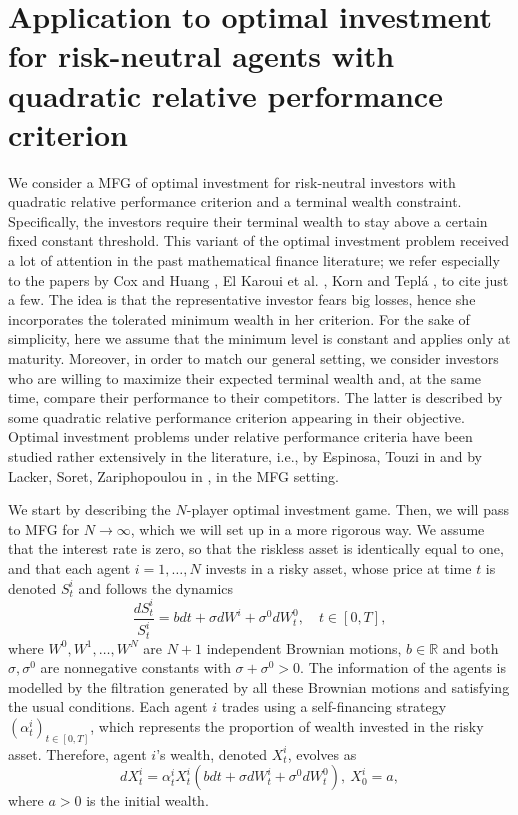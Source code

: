 \documentclass[11pt,a4paper]{article}
\begin{document}
\section{Application to optimal investment for risk-neutral agents with quadratic relative performance criterion}\label{sec:appl}


We consider a MFG of optimal investment for risk-neutral investors with quadratic relative performance criterion and a terminal wealth constraint. Specifically, the investors require their terminal wealth to stay above a certain fixed constant threshold. This variant of the optimal investment problem received a lot of attention in the past mathematical finance literature; we refer especially to the papers by Cox and Huang \cite{Cox Huang}, El Karoui et al. \cite{ElK-J-L}, Korn \cite{Korn} and Tepl\'a \cite{Tepla}, to cite just a few. The idea is that the representative investor fears big losses, hence she incorporates the tolerated minimum wealth in her criterion. For the sake of simplicity, here we assume that the minimum level is constant and applies only at maturity. Moreover, in order to match our general setting, we consider investors who are willing to maximize their expected terminal wealth and, at the same time, compare their performance to their competitors. The latter is described by some quadratic relative performance criterion appearing in their objective.  
 Optimal investment problems under relative performance criteria have been studied rather extensively in the literature, i.e., by Espinosa, Touzi in \cite{Espinosa Touzi} and by Lacker, Soret, Zariphopoulou in  \cite{Lacker S}, \cite{Lacker Z} in the MFG setting.\medskip
 
We start by describing the $N$-player optimal investment game. Then, we will pass to MFG for $N \to \infty$, which we will set up in a more rigorous way. We assume that the interest rate is zero, so that the riskless asset is identically equal to one, and that each agent $i = 1,\ldots, N$ invests in a risky asset, whose price at time $t$ is denoted $S_t ^i$ and follows the dynamics
\[ \frac{dS^i _t}{S_t ^i} = bdt + \sigma dW^i + \sigma^0 dW_t ^0, \quad t\in [0,T], \]
where $W^0, W^1, \ldots, W^{N}$ are $N+1$ independent Brownian motions, $b\in \mathbb R$ and both $\sigma, \sigma^0$ are nonnegative constants with $\sigma + \sigma^0 >0$. The information of the agents is modelled by the filtration generated by all these Brownian motions and satisfying the usual conditions.
Each agent $i$ trades using a self-financing strategy $(\alpha_t^i)_{t \in [0,T]}$, which represents the proportion of wealth invested in the risky asset. Therefore, agent $i$'s wealth, denoted $X_t ^i$, evolves as
$$dX_t^i=\alpha_t^i X_t^i(bdt+\sigma dW_t^i + \sigma^0 dW_t ^0) , \ X_0^i=a,$$
where $a > 0 $ is the initial wealth. 
\end{document}
